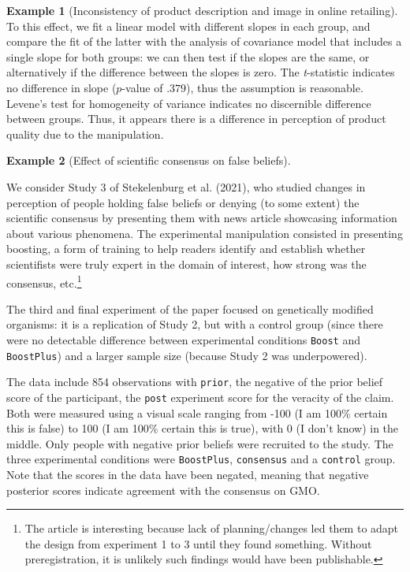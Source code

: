 \documentclass[
  11pt,
  letterpaper,
]{scrbook}
\theoremstyle{definition}
\theoremstyle{definition}
\newtheorem{example}{Example}[chapter]
\theoremstyle{remark}
\begin{document}
\begin{example}[Inconsistency of product description and image in online
retailing]
To this effect, we fit a linear model with different slopes in each
group, and compare the fit of the latter with the analysis of covariance
model that includes a single slope for both groups: we can then test if
the slopes are the same, or alternatively if the difference between the
slopes is zero. The \emph{t}-statistic indicates no difference in slope
(\(p\)-value of \(.379\)), thus the assumption is reasonable. Levene's
test for homogeneity of variance indicates no discernible difference
between groups. Thus, it appears there is a difference in perception of
product quality due to the manipulation.

\end{example}

\begin{example}[Effect of scientific consensus on false
beliefs]\protect\hypertarget{exm-vanStek}{}\label{exm-vanStek}

We consider Study 3 of Stekelenburg et al. (2021), who studied changes
in perception of people holding false beliefs or denying (to some
extent) the scientific consensus by presenting them with news article
showcasing information about various phenomena. The experimental
manipulation consisted in presenting boosting, a form of training to
help readers identify and establish whether scientifists were truly
expert in the domain of interest, how strong was the consensus,
etc.\footnote{The article is interesting because lack of
  planning/changes led them to adapt the design from experiment 1 to 3
  until they found something. Without preregistration, it is unlikely
  such findings would have been publishable.}

The third and final experiment of the paper focused on genetically
modified organisms: it is a replication of Study 2, but with a control
group (since there were no detectable difference between experimental
conditions \texttt{Boost} and \texttt{BoostPlus}) and a larger sample
size (because Study 2 was underpowered).

The data include 854 observations with \texttt{prior}, the negative of
the prior belief score of the participant, the \texttt{post} experiment
score for the veracity of the claim. Both were measured using a visual
scale ranging from -100 (I am 100\% certain this is false) to 100 (I am
100\% certain this is true), with 0 (I don't know) in the middle. Only
people with negative prior beliefs were recruited to the study. The
three experimental conditions were \texttt{BoostPlus},
\texttt{consensus} and a \texttt{control} group. Note that the scores in
the data have been negated, meaning that negative posterior scores
indicate agreement with the consensus on GMO.


\end{example}
\end{document}
